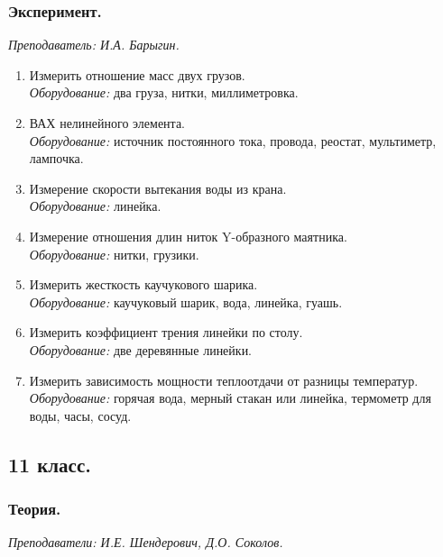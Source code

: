\documentclass[11pt]{article}
\newlength{\h}
\newlength{\x}
\begin{document}
\subsubsection{Эксперимент.}
\label{sec:exp10}

\textit{Преподаватель: И.А. Барыгин.}\\
\begin{enumerate}
\item Измерить отношение масс двух грузов.\\
  \textit{Оборудование:} два груза, нитки, миллиметровка.
\item ВАХ нелинейного элемента.\\
  \textit{Оборудование:} источник постоянного тока, провода, реостат,
  мультиметр, лампочка.
\item Измерение скорости вытекания воды из крана.\\
  \textit{Оборудование:} линейка.
\item Измерение отношения длин ниток Y-образного маятника.\\
  \textit{Оборудование:} нитки, грузики.
\item Измерить жесткость каучукового шарика.\\
  \textit{Оборудование:} каучуковый шарик, вода, линейка, гуашь.
\item Измерить коэффициент трения линейки по столу.\\
  \textit{Оборудование:} две деревянные линейки.
\item Измерить зависимость мощности теплоотдачи от разницы температур.\\
  \textit{Оборудование:} горячая вода, мерный стакан или линейка,
  термометр для воды, часы, сосуд.
\end{enumerate}

\subsection{11 класс.}
\label{sec:daily11}

\subsubsection{Теория.}
\label{sec:th11}

\textit{Преподаватели: И.Е. Шендерович, Д.О. Соколов.}
\end{document}
